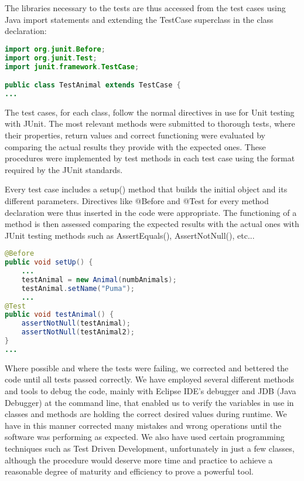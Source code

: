 \documentclass[11pt]{report}
\begin{document}
The libraries necessary to the tests are thus accessed from the test cases using Java import statements and extending the TestCase superclass in the class declaration:
\begin{lstlisting}[language=Java,caption= Test case headers, numbers=none]
import org.junit.Before;
import org.junit.Test;
import junit.framework.TestCase;

public class TestAnimal extends TestCase {
...
\end{lstlisting}

The test cases, for each class, follow the normal directives in use for Unit testing with JUnit. The most relevant methods were submitted to thorough tests, where their properties, return values and correct functioning were evaluated by comparing the actual results they provide with the expected ones. These procedures were implemented by test methods in each test case using the format required by the JUnit standards. 

Every test case includes a setup() method that builds the initial object and its different parameters. Directives like @Before and @Test for every method declaration were thus inserted in the code were appropriate. The functioning of a method is then assessed comparing the expected results with the actual ones with JUnit testing methods such as AssertEquals(), AssertNotNull(), etc...

\begin{lstlisting}[language=Java,caption= Use of JUnit directives in test cases, numbers=none]
@Before
public void setUp() {
    ...
    testAnimal = new Animal(numbAnimals);
    testAnimal.setName("Puma");
    ...
@Test
public void testAnimal() {
    assertNotNull(testAnimal);
    assertNotNull(testAnimal2);
} 
...
\end{lstlisting}

Where possible and where the tests were failing, we corrected and bettered the code until all tests passed correctly. We have employed several different methods and tools to debug the code, mainly with Eclipse IDE's debugger and JDB (Java Debugger) at the command line, that enabled us to verify the variables in use in classes and methods are holding the correct desired values during runtime. We have in this manner corrected many mistakes and wrong operations until the software was performing as expected. We also have used certain programming techniques such as Test Driven Development, unfortunately in just a few classes, although the procedure would deserve more time and practice to achieve a reasonable degree of maturity and efficiency to prove a powerful tool. 
\end{document}
